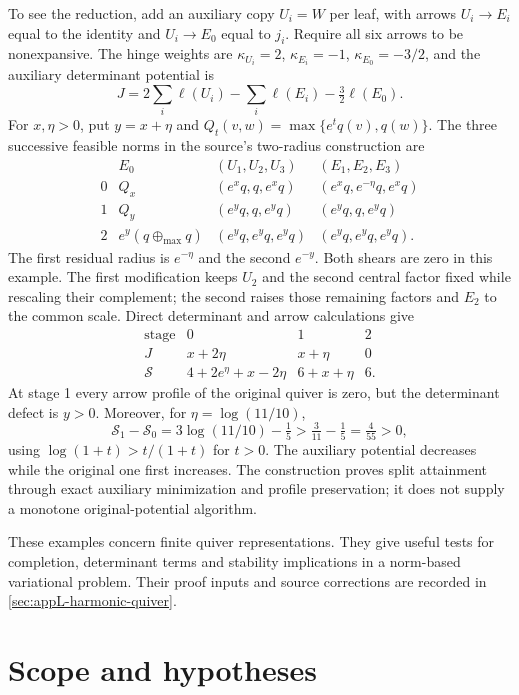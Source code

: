 To see the reduction, add an auxiliary copy $U_i=W$ per leaf, with
arrows $U_i\to E_i$ equal to the identity and $U_i\to E_0$ equal to
$j_i$. Require all six arrows to be nonexpansive. The hinge weights
are $\kappa_{U_i}=2$, $\kappa_{E_i}=-1$, $\kappa_{E_0}=-3/2$, and
the auxiliary determinant potential is
\[
 J=2\sum_i\ell(U_i)-\sum_i\ell(E_i)-\tfrac32\ell(E_0).
\]
For $x,\eta>0$, put $y=x+\eta$ and
$Q_t(v,w)=\max\{e^tq(v),q(w)\}$. The three successive feasible
norms in the source's two-radius construction are
\[
\begin{array}{c|c|c|c}
 &E_0 &(U_1,U_2,U_3)&(E_1,E_2,E_3)\\ \hline
0&Q_x &(e^xq,q,e^xq)&(e^xq,e^{-\eta}q,e^xq)\\
1&Q_y &(e^yq,q,e^yq)&(e^yq,q,e^yq)\\
2&e^y(q\oplus_{\max}q)&(e^yq,e^yq,e^yq)&(e^yq,e^yq,e^yq).
\end{array}
\]
The first residual radius is $e^{-\eta}$ and the second $e^{-y}$.
Both shears are zero in this example. The first modification keeps
$U_2$ and the second central factor fixed while rescaling their
complement; the second raises those remaining factors and $E_2$ to
the common scale. Direct determinant and arrow calculations give
\[
\begin{array}{c|ccc}
\text{stage}&0&1&2\\ \hline
J&x+2\eta&x+\eta&0\\
\mathscr S&4+2e^\eta+x-2\eta&6+x+\eta&6.
\end{array}
\tag{50.90l}\label{eq:ch50-quiver-two-radius-potentials}
\]
At stage 1 every arrow profile of the original quiver is zero, but
the determinant defect is $y>0$. Moreover, for $\eta=\log(11/10)$,
\[
 \mathscr S_1-\mathscr S_0=3\log(11/10)-\tfrac15
       >\tfrac3{11}-\tfrac15=\tfrac4{55}>0,
\]
using $\log(1+t)>t/(1+t)$ for $t>0$. The auxiliary potential decreases
while the original one first increases. The construction proves split
attainment through exact auxiliary minimization and profile preservation;
it does not supply a monotone original-potential algorithm.

These examples concern finite quiver representations. They give useful
tests for completion, determinant terms and stability implications in a
norm-based variational problem. Their proof inputs and source corrections
are recorded in \cref{sec:appL-harmonic-quiver}.

\section{Scope and hypotheses}
\label{sec:ch50-scope}

